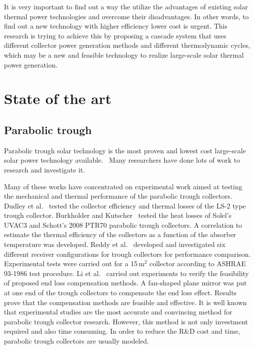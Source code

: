 It is very important to find out a way the utilize the advantages of existing solar thermal power technologies and overcome their disadvantages. In other words, to find out a new technology with higher efficiency lower cost is urgent.
This research is trying to achieve this by proposing a cascade system that uses different collector power generation methods and different thermodynamic cycles, which may be a new and feasible technology to realize large-scale solar thermal power generation.

\section{State of the art}

\subsection{Parabolic trough}

Parabolic trough solar technology is the most proven and lowest cost large-scale solar power technology available.~\cite{Price2002}
Many researchers have done lots of work to research and investigate it. 

Many of these works have concentrated on experimental work aimed at testing the mechanical and thermal performance of the parabolic trough collectors. Dudley et al.~\cite{Dudley1994} tested the collector efficiency and thermal losses of the LS-2 type trough collector. Burkholder and Kutscher~\cite{Burkholder2009} tested the heat losses of Solel's UVAC3 and Schott's 2008 PTR70 parabolic trough collectors. A correlation to estimate the thermal efficiency of the collectors as a function of the absorber temperature was developed. Reddy et al.~\cite{Reddy2015b} developed and investigated six different receiver configurations for trough collectors for performance comparison. Experimental tests were carried out for a 15$\,\mathrm{m^2}$ collector according to ASHRAE 93-1986 test procedure.
Li et al.~\cite{Li2015} carried out experiments to verify the feasibility of proposed end loss compensation methods. A fan-shaped plane mirror was put at one end of the trough collectors to compensate the end loss effect. Results prove that the compensation methods are feasible and effective.
It is well known that experimental studies are the most accurate and convincing method for parabolic trough collector research. However, this method is not only investment required and also time consuming. In order to reduce the R\&D cost and time, parabolic trough collectors are usually modeled.

